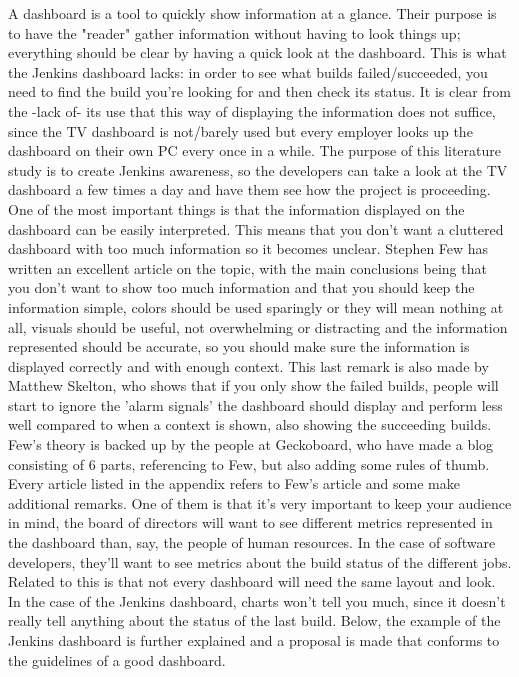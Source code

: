 \documentclass[10pt,a4paper]{report}
\begin{document}
A dashboard is a tool to quickly show information at a glance. Their purpose is to have the "reader" gather information without having to look things up; everything should be clear by having a quick look at the dashboard. This is what the Jenkins dashboard lacks: in order to see what builds failed/succeeded, you need to find the build you're looking for and then check its status. It is clear from the -lack of- its use that this way of displaying the information does not suffice, since the TV dashboard is not/barely used but every employer looks up the dashboard on their own PC every once in a while. 
The purpose of this literature study is to create Jenkins awareness, so the developers can take a look at the TV dashboard a few times a day and have them see how the project is proceeding.
One of the most important things is that the information displayed on the dashboard can be easily interpreted. This means that you don't want a cluttered dashboard with too much information so it becomes unclear.
Stephen Few has written an excellent article on the topic, with the main conclusions being that you don't want to show too much information and that you should keep the information simple, colors should be used sparingly or they will mean nothing at all, visuals should be useful, not overwhelming or distracting and the information represented should be accurate, so you should make sure the information is displayed correctly and with enough context. This last remark is also made by Matthew Skelton, who shows that if you only show the failed builds, people will start to ignore the 'alarm signals' the dashboard should display and perform less well compared to when a context is shown, also showing the succeeding builds. Few’s theory is backed up by the people at Geckoboard, who have made a blog consisting of 6 parts, referencing to Few, but also adding some rules of thumb. Every article listed in the appendix refers to Few’s article and some make additional remarks. One of them is that it’s very important to keep your audience in mind, the board of directors will want to see different metrics represented in the dashboard than, say, the people of human resources. In the case of software developers, they’ll want to see metrics about the build status of the different jobs. Related to this is that not every dashboard will need the same layout and look. In the case of the Jenkins dashboard, charts won’t tell you much, since it doesn’t really tell anything about the status of the last build. Below, the example of the Jenkins dashboard is further explained and a proposal is made that conforms to the guidelines of a good dashboard.
\end{document}
